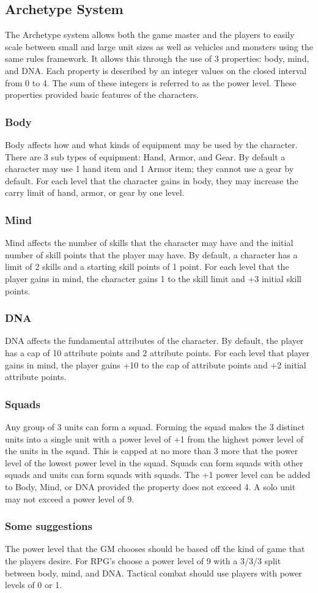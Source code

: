 \subsection{Archetype System}
The Archetype system allows both the game master and the players to easily
scale between small and large unit sizes as well as vehicles and monsters using
the same rules framework. It allows this through the use of 3 properties: body,
mind, and DNA.  Each property is described by an integer values on the closed
interval from 0 to 4.  The sum of these integers is referred to as the power
level.  These properties provided basic features of the characters.
\subsubsection{Body}
Body affects how and what kinds of equipment may be used by the character.
There are 3 sub types of equipment: Hand, Armor, and Gear.  By default a
character may use 1 hand item and 1 Armor item;  they cannot use a gear by
default.  For each level that the character gains in body, they may increase the
carry limit of hand, armor, or gear by one level.
\subsubsection{Mind}
Mind affects the number of skills that the character may have and the initial
number of skill points that the player may have.  By default, a character has a
limit of 2 skills and a starting skill points of 1 point.  For each level that
the player gains in mind, the character gains 1 to the skill limit and +3
initial skill points.
\subsubsection{DNA}
DNA affects the fundamental attributes of the character.  By default, the player
has a cap of 10 attribute points and 2 attribute points.  For each level that
player gains in mind, the player gains +10 to the cap of attribute points and +2
initial attribute points.
\subsubsection{Squads}
Any group of 3 units can form a squad.  Forming the squad makes the 3 distinct
units into a single unit with a power level of +1 from the highest power level
of the units in the squad.  This is capped at no more than 3 more that the power
level of the lowest  power level in the squad.  Squads can form squads with
other squads and units can form squads with squads.  The +1 power level can be
added to Body, Mind, or DNA provided the property does not exceed 4.  A solo
unit may not exceed a power level of 9.
\subsubsection{Some suggestions}
The power level that the GM chooses should be based off the kind of game that
the players desire.  For RPG's choose a power level of 9 with a 3/3/3 split
between body, mind, and DNA. Tactical combat should use players with power
levels of 0 or 1.
